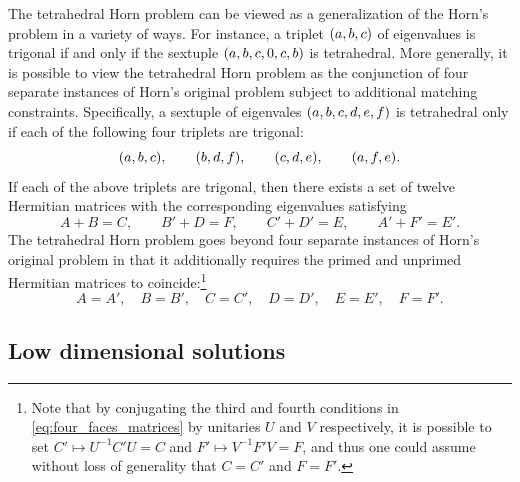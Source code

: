 \documentclass[notitlepage, 10pt]{article}
\begin{document}
The tetrahedral Horn problem can be viewed as a generalization of the Horn's problem in a variety of ways.
For instance, a triplet $(a,b,c)$ of eigenvalues is trigonal if and only if the sextuple $(a,b,c,0,c,b)$ is tetrahedral.
More generally, it is possible to view the tetrahedral Horn problem as the conjunction of four separate instances of Horn's original problem subject to additional matching constraints.
Specifically, a sextuple of eigenvales $(a,b,c,d,e,f)$ is tetrahedral only if each of the following four triplets are trigonal:
\begin{equation}
    \label{eq:four_faces}
    (a,b,c), \qquad
    (b,d,f), \qquad
    (c,d,e), \qquad
    (a,f,e).
\end{equation}
If each of the above triplets are trigonal, then there exists a set of twelve Hermitian matrices with the corresponding eigenvalues satisfying
\begin{equation}
    \label{eq:four_faces_matrices}
    A+B=C, \qquad B'+D=F, \qquad C'+D'=E, \qquad A'+F'=E'.
\end{equation}
The tetrahedral Horn problem goes beyond four separate instances of Horn's original problem in that it additionally requires the primed and unprimed Hermitian matrices to coincide:\footnote{Note that by conjugating the third and fourth conditions in \cref{eq:four_faces_matrices} by unitaries $U$ and $V$ respectively, it is possible to set $C' \mapsto U^{-1} C' U = C$ and $F' \mapsto V^{-1} F' V = F$, and thus one could assume without loss of generality that $C=C'$ and $F=F'$.}
\begin{equation}
    A = A', \quad 
    B = B', \quad
    C = C', \quad
    D = D', \quad
    E = E', \quad
    F = F'.
\end{equation}

\subsection{Low dimensional solutions}
\end{document}

